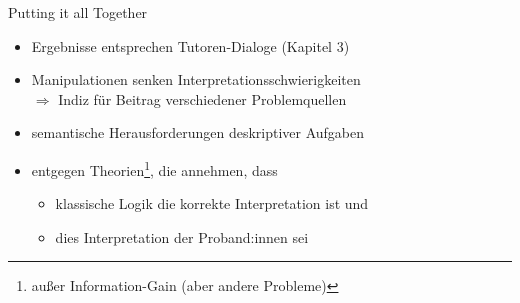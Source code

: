 \begin{frame}{Putting it all Together {\scriptsize \cite[S.~110-112]{stenningHumanReasoningCognitive2008}}}
    \begin{itemize}
        \item Ergebnisse entsprechen Tutoren-Dialoge (Kapitel 3)
        \item Manipulationen senken Interpretationsschwierigkeiten \\
            $\Rightarrow$ Indiz für Beitrag verschiedener Problemquellen
        \item semantische Herausforderungen deskriptiver Aufgaben
        
        \item entgegen Theorien\footnote[frame]{\scriptsize außer Information-Gain (aber andere Probleme)}, die annehmen, dass
        \begin{itemize}
            \item klassische Logik die korrekte Interpretation ist und
            \item dies Interpretation der Proband:innen sei
        \end{itemize}
    \end{itemize}
\end{frame}
